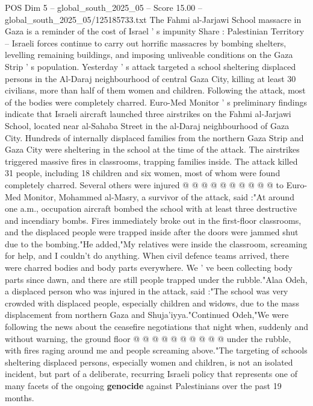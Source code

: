 \begin{textsample}{POS Dim 5 – global\_south\_2025\_05 – Score 15.00 – global\_south\_2025\_05/125185733.txt}  \label{ex:f5_pos_195}
The Fahmi al-Jarjawi School massacre in Gaza is a reminder of the cost of Israel ' s impunity Share : Palestinian Territory -- Israeli forces continue to carry out horrific massacres by bombing shelters, levelling remaining buildings, and imposing unliveable conditions on the Gaza Strip ' s population.
Yesterday ' s attack targeted a school sheltering displaced persons in the Al-Daraj neighbourhood of central Gaza City, killing at least 30 civilians, more than half of them women and children.
Following the attack, most of the bodies were completely charred.
Euro-Med Monitor ' s preliminary findings indicate that Israeli aircraft launched three airstrikes on the Fahmi al-Jarjawi School, located near al-Sahaba Street in the al-Daraj neighbourhood of Gaza City.
Hundreds of internally displaced families from the northern Gaza Strip and Gaza City were sheltering in the school at the time of the attack.
The airstrikes triggered massive fires in classrooms, trapping families inside.
The attack killed 31 people, including 18 children and six women, most of whom were found completely charred.
Several others were injured @ @ @ @ @ @ @ @ @ @ to Euro-Med Monitor, Mohammed al-Masry, a survivor of the attack, said :"At around one a.m., occupation aircraft bombed the school with at least three destructive and incendiary bombs.
Fires immediately broke out in the first-floor classrooms, and the displaced people were trapped inside after the doors were jammed shut due to the bombing."He added,"My relatives were inside the classroom, screaming for help, and I couldn't do anything.
When civil defence teams arrived, there were charred bodies and body parts everywhere.
We ' ve been collecting body parts since dawn, and there are still people trapped under the rubble."Alaa Odeh, a displaced person who was injured in the attack, said :"The school was very crowded with displaced people, especially children and widows, due to the mass displacement from northern Gaza and Shuja'iyya."Continued Odeh,"We were following the news about the ceasefire negotiations that night when, suddenly and without warning, the ground floor @ @ @ @ @ @ @ @ @ @ under the rubble, with fires raging around me and people screaming above."The targeting of schools sheltering displaced persons, especially women and children, is not an isolated incident, but part of a deliberate, recurring Israeli policy that represents one of many facets of the ongoing \textbf{genocide} against Palestinians over the past 19 months.

\end{textsample}
